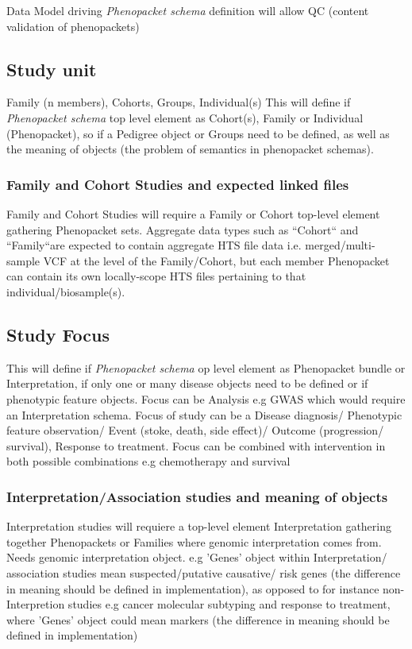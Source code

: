 \documentclass[a4paper, 10pt]{article}        %
\begin{document}
Data Model driving \textit{Phenopacket schema} definition will allow QC (content validation of phenopackets)

\subsection{Study unit}

Family (n members), Cohorts, Groups, Individual(s)
This will define if \textit{Phenopacket schema} top level element as Cohort(s), Family or Individual (Phenopacket), so if a Pedigree object or Groups need to be defined, as well as the meaning of objects (the  problem of semantics in phenopacket schemas).


\subsubsection{Family and Cohort Studies and expected linked files}
Family and Cohort Studies will require a Family or Cohort top-level element gathering Phenopacket sets. 
Aggregate data types such as ``Cohort`` and ``Family``are expected to contain aggregate HTS file data i.e. merged/multi-sample VCF at the level of the Family/Cohort, but each member Phenopacket can contain its own locally-scope HTS files pertaining to that individual/biosample(s).


\subsection{Study Focus}
This will define if \textit{Phenopacket schema} op level element as Phenopacket bundle or Interpretation, if only one or many disease objects need to be defined or if phenotypic feature objects.
Focus can be Analysis e.g GWAS which would require an Interpretation schema.
Focus of study can be a Disease diagnosis/ Phenotypic feature observation/ Event (stoke, death, side effect)/ Outcome (progression/ survival), Response to treatment.
Focus can be combined with intervention in both possible combinations e.g chemotherapy and survival

\subsubsection{Interpretation/Association studies and meaning of objects}
Interpretation studies will requiere a top-level element Interpretation gathering together Phenopackets or Families where 
genomic interpretation comes from. Needs genomic interpretation object.
e.g 'Genes' object within Interpretation/ association studies mean suspected/putative causative/ risk genes (the difference in meaning should be defined in implementation), as opposed to for instance non-Interpretion studies e.g cancer molecular subtyping and response to treatment, where 'Genes' object could mean markers (the difference in meaning should be defined in implementation)
\end{document}
